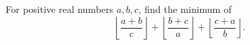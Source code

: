 For positive real numbers $a,b,c$, find the minimum of
\[
\left\lfloor\dfrac{a+b}{c}\right\rfloor+
\left\lfloor\dfrac{b+c}{a}\right\rfloor+
\left\lfloor\dfrac{c+a}{b}\right\rfloor.
\]
